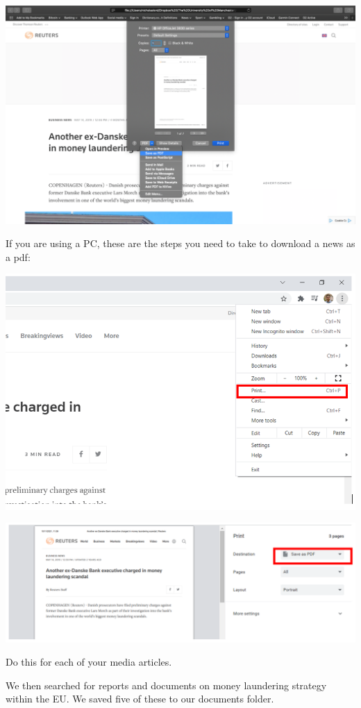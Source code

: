 \documentclass[
]{book}
\begin{document}
\includegraphics{imgs/mac_news_2.png}

If you are using a PC, these are the steps you need to take to download a news as a pdf:

\includegraphics{imgs/windows_print_1.png}

\includegraphics{imgs/windows_print_2.png}

Do this for each of your media articles.

We then searched for reports and documents on money laundering strategy within the EU. We saved five of these to our documents folder.
\end{document}
